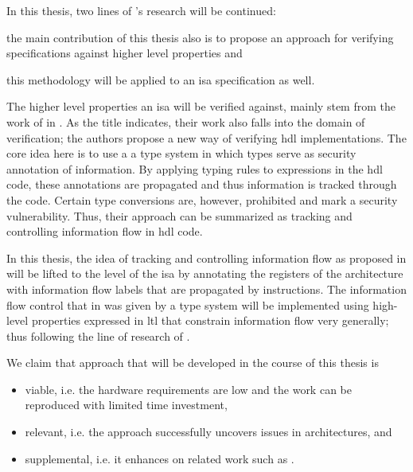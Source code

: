 In this thesis, two lines of \citeauthor{Reid17}'s research will be continued: \begin{enumerate*}[label=\alph*)]
    \item the main contribution of this thesis also is to propose an approach for verifying specifications against higher level properties and
    \item this methodology will be applied to an \gls{isa} specification as well.
\end{enumerate*}

The higher level properties an \gls{isa} will be verified against, mainly stem from the work of \citeauthor{Ferraiuolo17} in  \cite{Ferraiuolo17}.
As the title indicates, their work also falls into the domain of verification; the authors propose a new way of verifying \gls{hdl} implementations.
The core idea here is to use a a type system in which types serve as security annotation of information.
By applying typing rules to expressions in the \gls{hdl} code, these annotations are propagated and thus information is tracked through the code.
Certain type conversions are, however, prohibited and mark a security vulnerability.
Thus, their approach can be summarized as tracking and controlling information flow in \gls{hdl} code.

In this thesis, the idea of tracking and controlling information flow as proposed in \cite{Ferraiuolo17} will be lifted to the level of the \gls{isa} by annotating the registers of the architecture with information flow labels that are propagated by instructions.
The information flow control that in \cite{Ferraiuolo17} was given by a type system will be implemented using high-level properties expressed in \gls{ltl} that constrain information flow very generally; thus following the line of research of \cite{Reid17}.

We claim that approach that will be developed in the course of this thesis is
\begin{itemize}
    \item viable, i.e. the hardware requirements are low and the work can be reproduced with limited time investment,
    \item relevant, i.e. the approach successfully uncovers issues in architectures, and
    \item supplemental, i.e. it enhances on related work such as \cite{Reid17}.
\end{itemize}

